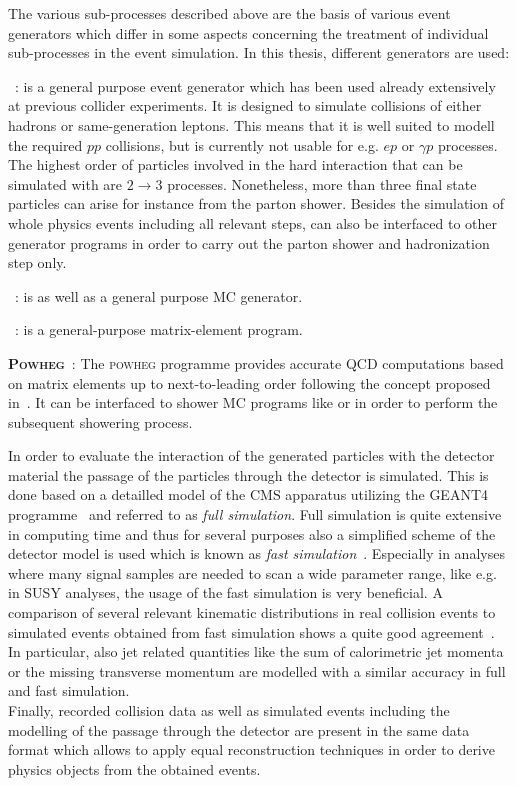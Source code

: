 The various sub-processes described above are the basis of various event generators which differ in some aspects concerning the treatment of individual sub-processes in the event simulation. In this thesis, different generators are used:
\begin{description}
 \item \textbf{\pythia}~\cite{Sjostrand:2006za}: \pythia is a general purpose event generator which has been used already extensively at previous collider experiments. It is designed to simulate collisions of either hadrons or same-generation leptons. This means that it is well suited to modell the required $pp$ collisions, but is currently not usable for e.g. $ep$ or $\gamma p$ processes. The highest order of particles involved in the hard interaction that can be simulated with \pythia are $2 \rightarrow 3$ processes. Nonetheless, more than three final state particles can arise for instance from the parton shower. Besides the simulation of whole physics events including all relevant steps, \pythia can also be interfaced to other generator programs in order to carry out the parton shower and hadronization step only.
 \item \textbf{\herwig}~\cite{Bahr:2008pv}: \herwig is as well as \pythia a general purpose MC generator.
 \item \textbf{\madgraph}~\cite{Alwall:2007st}: \madgraph is a general-purpose matrix-element program. 
 \item \textbf{\textsc{Powheg}}~\cite{Oleari:2010nx}: The \textsc{powheg} programme provides accurate QCD computations based on matrix elements up to next-to-leading order following the concept proposed in~\cite{Nason:2004rx}. It can be interfaced to shower MC programs like \pythia or \herwig in order to perform the subsequent showering process.   
\end{description}
In order to evaluate the interaction of the generated particles with the detector material the passage of the particles through the detector is simulated. This is done based on a detailled model of the CMS apparatus utilizing the GEANT4 programme~\cite{Agostinelli2003250} and referred to as \textit{full simulation}. Full simulation is quite extensive in computing time and thus for several purposes also a simplified scheme of the detector model is used which is known as \textit{fast simulation}~\cite{Abdullin:2011zz}. Especially in analyses where many signal samples are needed to scan a wide parameter range, like e.g. in SUSY analyses, the usage of the fast simulation is very beneficial. A comparison of several relevant kinematic distributions in real collision events to simulated events obtained from fast simulation shows a quite good agreement~\cite{CMS-DP-2010-039}. In particular, also jet related quantities like the sum of calorimetric jet momenta or the missing transverse momentum are modelled with a similar accuracy in full and fast simulation. \\  
Finally, recorded collision data as well as simulated events including the modelling of the passage through the detector are present in the same data format which allows to apply equal reconstruction techniques in order to derive physics objects from the obtained events.


